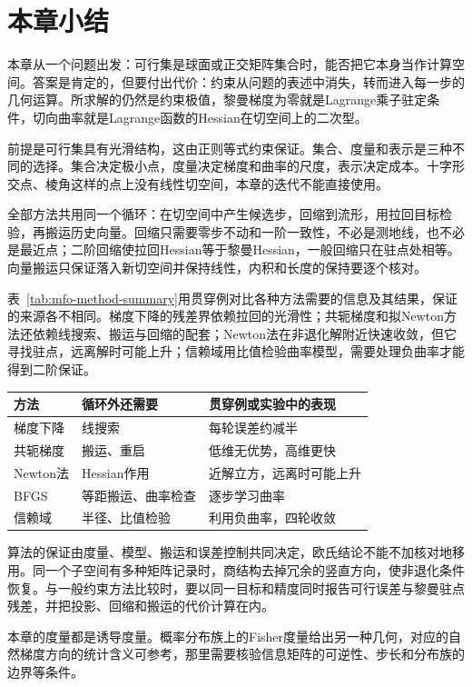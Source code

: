 \section{本章小结}
\label{sec:mfo-summary}

本章从一个问题出发：可行集是球面或正交矩阵集合时，能否把它本身当作计算空间。答案是肯定的，但要付出代价：约束从问题的表述中消失，转而进入每一步的几何运算。所求解的仍然是约束极值，黎曼梯度为零就是Lagrange乘子驻定条件，切向曲率就是Lagrange函数的Hessian在切空间上的二次型。

前提是可行集具有光滑结构，这由正则等式约束保证。集合、度量和表示是三种不同的选择。集合决定极小点，度量决定梯度和曲率的尺度，表示决定成本。十字形交点、棱角这样的点上没有线性切空间，本章的迭代不能直接使用。

全部方法共用同一个循环：在切空间中产生候选步，回缩到流形，用拉回目标检验，再搬运历史向量。回缩只需要零步不动和一阶一致性，不必是测地线，也不必是最近点；二阶回缩使拉回Hessian等于黎曼Hessian，一般回缩只在驻点处相等。向量搬运只保证落入新切空间并保持线性，内积和长度的保持要逐个核对。

表~\ref{tab:mfo-method-summary}用贯穿例对比各种方法需要的信息及其结果，保证的来源各不相同。梯度下降的残差界依赖拉回的光滑性；共轭梯度和拟Newton方法还依赖线搜索、搬运与回缩的配套；Newton法在非退化解附近快速收敛，但它寻找驻点，远离解时可能上升；信赖域用比值检验曲率模型，需要处理负曲率才能得到二阶保证。

\begin{BookInlineTable}
 \centering
 \caption{本章各方法的比较。}
 \label{tab:mfo-method-summary}
 \begin{tabular}{lll}
  \toprule
  方法 & 循环外还需要 & 贯穿例或实验中的表现\\
  \midrule
  梯度下降 & 线搜索 & 每轮误差约减半\\
  共轭梯度 & 搬运、重启 & 低维无优势，高维更快\\
  Newton法 & Hessian作用 & 近解立方，远离时可能上升\\
  BFGS & 等距搬运、曲率检查 & 逐步学习曲率\\
  信赖域 & 半径、比值检验 & 利用负曲率，四轮收敛\\
  \bottomrule
 \end{tabular}
\end{BookInlineTable}

算法的保证由度量、模型、搬运和误差控制共同决定，欧氏结论不能不加核对地移用。同一个子空间有多种矩阵记录时，商结构去掉冗余的竖直方向，使非退化条件恢复。与一般约束方法比较时，要以同一目标和精度同时报告可行误差与黎曼驻点残差，并把投影、回缩和搬运的代价计算在内。

本章的度量都是诱导度量。概率分布族上的Fisher度量给出另一种几何，对应的自然梯度方向的统计含义可参考，那里需要核验信息矩阵的可逆性、步长和分布族的边界等条件。
